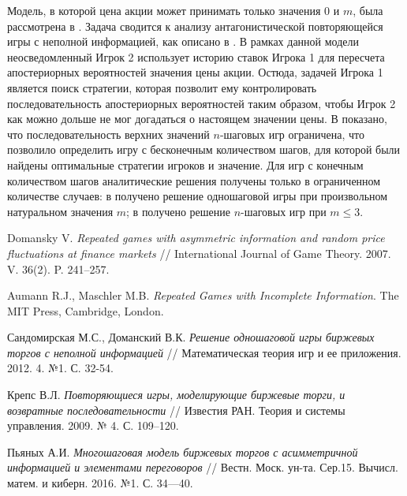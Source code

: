 \documentclass[12pt, draft]{extarticle}
\begin{document}
Модель, в которой цена акции может принимать только значения $0$ и $m$, была
рассмотрена в \cite{bib:domansky07}. Задача сводится к анализу антагонистической
повторяющейся игры с неполной информацией, как описано в \cite{bib:aumann}. В
рамках данной модели неосведомленный Игрок 2 использует историю ставок Игрока 1
для пересчета апостериорных вероятностей значения цены акции. Остюда, задачей
Игрока 1 является поиск стратегии, которая позволит ему контролировать
последовательность апостериорных вероятностей таким образом, чтобы Игрок 2 как
можно дольше не мог догадаться о настоящем значении цены. В
\cite{bib:domansky07} показано, что последовательность верхних значений
$n$-шаговых игр ограничена, что позволило определить игру с бесконечным
количеством шагов, для которой были найдены оптимальные стратегии игроков и
значение. Для игр с конечным количеством шагов аналитические решения получены
только в ограниченном количестве случаев: в \cite{bib:sandomirskaya12} получено
решение одношаговой игры при произвольном натуральном значения $m$; в
\cite{bib:kreps09} получено решение $n$-шаговых игр при $m \leqslant 3$.


\begin{thebibliography}{99}

%
  Domansky V. \emph{Repeated games with asymmetric information and random price
    fluctuations at finance markets} // International Journal of Game Theory.
  2007. V. 36(2). P. 241--257.

%
  Aumann R.J., Maschler M.B. \emph{Repeated Games with Incomplete Information}.
  The MIT Press, Cambridge, London.

%
  Сандомирская М.С., Доманский В.К. \emph{Решение одношаговой игры биржевых
    торгов с неполной информацией} // Математическая теория игр и ее приложения.
  2012. 4. №1. С. 32-54.

%
  Крепс В.Л. \emph{Повторяющиеся игры, моделирующие биржевые торги, и возвратные
    последовательности} // Известия РАН. Теория и системы управления. 2009. № 4.
  С. 109--120.



%
  Пьяных А.И. \textit{Многошаговая модель биржевых торгов с асимметричной
    информацией и элементами переговоров} // Вестн. Моск. ун-та. Сер.15. Вычисл.
  матем. и киберн. 2016. №1. С. 34—40.
\end{thebibliography}
\end{document}
